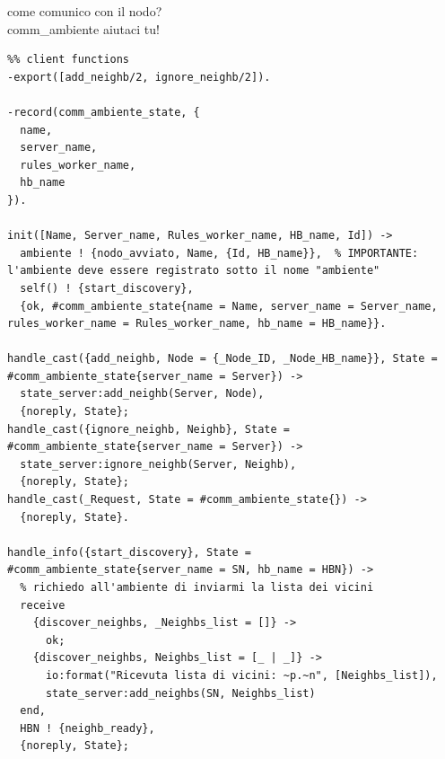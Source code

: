 \documentclass[italian]{memoir}
\begin{document}
come comunico con il nodo?\\
comm\_ambiente aiutaci tu!
\begin{verbatim}
%% client functions
-export([add_neighb/2, ignore_neighb/2]).

-record(comm_ambiente_state, {
  name,
  server_name,
  rules_worker_name,
  hb_name
}).

init([Name, Server_name, Rules_worker_name, HB_name, Id]) ->
  ambiente ! {nodo_avviato, Name, {Id, HB_name}},  % IMPORTANTE: l'ambiente deve essere registrato sotto il nome "ambiente"
  self() ! {start_discovery},
  {ok, #comm_ambiente_state{name = Name, server_name = Server_name, rules_worker_name = Rules_worker_name, hb_name = HB_name}}.

handle_cast({add_neighb, Node = {_Node_ID, _Node_HB_name}}, State = #comm_ambiente_state{server_name = Server}) ->
  state_server:add_neighb(Server, Node),
  {noreply, State};
handle_cast({ignore_neighb, Neighb}, State = #comm_ambiente_state{server_name = Server}) ->
  state_server:ignore_neighb(Server, Neighb),
  {noreply, State};
handle_cast(_Request, State = #comm_ambiente_state{}) ->
  {noreply, State}.
  
handle_info({start_discovery}, State = #comm_ambiente_state{server_name = SN, hb_name = HBN}) ->
  % richiedo all'ambiente di inviarmi la lista dei vicini
  receive
    {discover_neighbs, _Neighbs_list = []} ->
      ok;
    {discover_neighbs, Neighbs_list = [_ | _]} ->
      io:format("Ricevuta lista di vicini: ~p.~n", [Neighbs_list]),
      state_server:add_neighbs(SN, Neighbs_list)
  end,
  HBN ! {neighb_ready},
  {noreply, State};
  
\end{verbatim}
%
%
%


%
\end{document}
